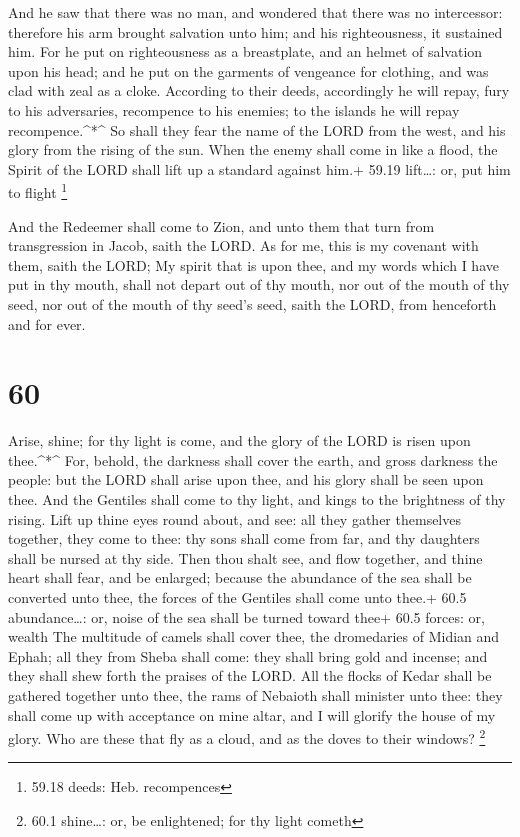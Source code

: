  And he saw that there was no man, and wondered that there
was no intercessor: therefore his arm brought salvation unto him; and
his righteousness, it sustained him.  For he put on
righteousness as a breastplate, and an helmet of salvation upon his
head; and he put on the garments of vengeance for clothing, and was clad
with zeal as a cloke.  According to their deeds,
accordingly he will repay, fury to his adversaries, recompence to his
enemies; to the islands he will repay recompence.\^{}*\^{} 
So shall they fear the name of the LORD from the west, and his glory
from the rising of the sun. When the enemy shall come in like a flood,
the Spirit of the LORD shall lift up a standard against him.+ 59.19
lift\ldots: or, put him to flight \footnote{59.18 deeds: Heb.
  recompences}

 And the Redeemer shall come to Zion, and unto them that
turn from transgression in Jacob, saith the LORD.  As for
me, this is my covenant with them, saith the LORD; My spirit that is
upon thee, and my words which I have put in thy mouth, shall not depart
out of thy mouth, nor out of the mouth of thy seed, nor out of the mouth
of thy seed's seed, saith the LORD, from henceforth and for ever.

\hypertarget{section-59}{%
\section{60}\label{section-59}}

 Arise, shine; for thy light is come, and the glory of the
LORD is risen upon thee.\^{}*\^{}  For, behold, the darkness
shall cover the earth, and gross darkness the people: but the LORD shall
arise upon thee, and his glory shall be seen upon thee.  And
the Gentiles shall come to thy light, and kings to the brightness of thy
rising.  Lift up thine eyes round about, and see: all they
gather themselves together, they come to thee: thy sons shall come from
far, and thy daughters shall be nursed at thy side.  Then
thou shalt see, and flow together, and thine heart shall fear, and be
enlarged; because the abundance of the sea shall be converted unto thee,
the forces of the Gentiles shall come unto thee.+ 60.5 abundance\ldots:
or, noise of the sea shall be turned toward thee+ 60.5 forces: or,
wealth  The multitude of camels shall cover thee, the
dromedaries of Midian and Ephah; all they from Sheba shall come: they
shall bring gold and incense; and they shall shew forth the praises of
the LORD.  All the flocks of Kedar shall be gathered
together unto thee, the rams of Nebaioth shall minister unto thee: they
shall come up with acceptance on mine altar, and I will glorify the
house of my glory.  Who are these that fly as a cloud, and
as the doves to their windows? \footnote{60.1 shine\ldots: or, be
  enlightened; for thy light cometh}

